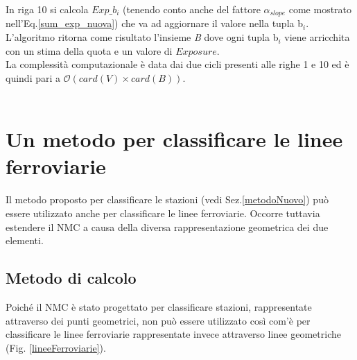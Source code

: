 In riga 10 si calcola $Exp\_b_i$ (tenendo conto anche del fattore $\alpha_{slope}$ come mostrato nell'Eq.\ref{sum_exp_nuova}) che va ad aggiornare il valore nella tupla b$_i$.\\
L'algoritmo ritorna come risultato l'insieme \textit{B} dove ogni tupla b$_i$ viene arricchita con un stima della quota e un valore di $Exposure$. 
\mbox{}\\
La complessità computazionale è data dai due cicli presenti alle righe 1 e 10 ed è quindi pari a $\mathcal{O}(card(\textit{V}) \times card(\textit{B}))$. \\
\mbox{}\\





\section{Un metodo per classificare le linee ferroviarie}
Il metodo proposto per classificare le stazioni (vedi Sez.\ref{metodoNuovo}) può essere utilizzato anche per classificare le linee ferroviarie. Occorre tuttavia estendere il NMC a causa della diversa rappresentazione geometrica dei due elementi.


\subsection{Metodo di calcolo}
\label{metodoLinee}
Poiché il NMC è stato progettato per classificare stazioni,  rappresentate attraverso dei punti geometrici, non può essere utilizzato così com'è per classificare le linee ferroviarie rappresentate invece attraverso linee geometriche (Fig. \ref{lineeFerroviarie}).


